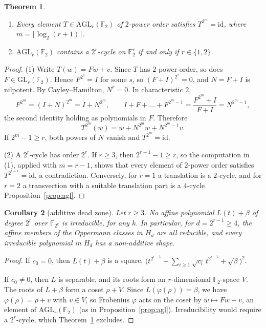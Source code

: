 \documentclass[11pt,a4paper]{amsart}
\newtheorem{theorem}{Theorem}[section]
\newtheorem{corollary}[theorem]{Corollary}
\theoremstyle{definition}
\theoremstyle{remark}
\newcommand{\F}{\mathbb{F}}
\begin{document}
\begin{theorem}\label{thm:agl}
\begin{enumerate}
\item Every element $T\in\mathrm{AGL}_r(\F_2)$ of $2$-power order satisfies $T^{2^m}=\mathrm{id}$, where
$m=\lceil\log_2(r+1)\rceil$.
\item $\mathrm{AGL}_r(\F_2)$ contains a $2^r$-cycle on $\F_2^r$ if and only if $r\in\{1,2\}$.
\end{enumerate}
\end{theorem}

\begin{proof}
(1) Write $T(w)=Fw+v$. Since $T$ has $2$-power order, so does $F\in\mathrm{GL}_r(\F_2)$. Hence $F^{2^s}=I$ for some
$s$, so $(F+I)^{2^s}=0$, and $N=F+I$ is nilpotent. By Cayley--Hamilton, $N^r=0$. In characteristic $2$,
\[
F^{2^m}=(I+N)^{2^m}=I+N^{2^m},\qquad I+F+\dots+F^{2^m-1}=\frac{F^{2^m}+I}{F+I}=N^{2^m-1},
\]
the second identity holding as polynomials in $F$. Therefore
\[
T^{2^m}(w)=w+N^{2^m}w+N^{2^m-1}v .
\]
If $2^m-1\ge r$, both powers of $N$ vanish and $T^{2^m}=\mathrm{id}$.

(2) A $2^r$-cycle has order $2^r$. If $r\ge3$, then $2^{r-1}-1\ge r$, so the computation in (1), applied with $m=r-1$, shows that every
element of $2$-power order satisfies $T^{2^{r-1}}=\mathrm{id}$, a contradiction. Conversely, for $r=1$ a translation is a
$2$-cycle, and for $r=2$ a transvection with a suitable translation part is a $4$-cycle Proposition~\ref{prop:agl}.
\end{proof}

\begin{corollary}[additive dead zone]\label{cor:dead}
Let $r\ge3$. No affine polynomial $L(t)+\beta$ of degree $2^r$ over $\F_{2^k}$ is irreducible, for any $k$. In
particular, for $d=2^{r-1}\ge4$, the affine members of the Oppermann classes in $H_d$ are all reducible, and every
irreducible polynomial in $H_d$ has a non-additive shape.
\end{corollary}

\begin{proof}
If $c_0=0$, then $L(t)+\beta$ is a square, $\bigl(t^{2^{r-1}}+\sum_{i\ge1}\sqrt{c_i}\,t^{2^{i-1}}+\sqrt\beta\bigr)^2$.

If $c_0\ne0$, then $L$ is separable, and its roots form an $r$-dimensional $\F_2$-space $V$. The roots of
$L+\beta$ form a coset $\rho+V$. Since $L(\varphi(\rho))=\beta$, we have $\varphi(\rho)=\rho+v$ with $v\in V$, so
Frobenius $\varphi$ acts on the coset by $w\mapsto Fw+v$, an element of $\mathrm{AGL}_r(\F_2)$ (as in
Proposition~\ref{prop:agl}). Irreducibility would require a $2^r$-cycle, which Theorem~\ref{thm:agl} excludes.
\end{proof}
\end{document}
